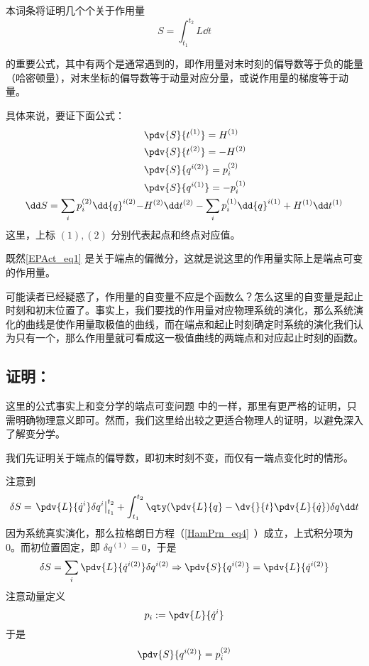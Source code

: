 
本词条将证明几个个关于作用量
\begin{equation}
S=\int_{t_1}^{t_2}L\dd t
\end{equation}

的重要公式，其中有两个是通常遇到的，即作用量对末时刻的偏导数等于负的能量（哈密顿量），对末坐标的偏导数等于动量对应分量，或说作用量的梯度等于动量。

具体来说，要证下面公式：
\begin{equation}\label{EPAct_eq1}
\begin{aligned}
&\pdv{S}{t^{(1)}}=H^{(1)}\\
&\pdv{S}{t^{(2)}}=-H^{(2)}\\
&\pdv{S}{{q}^{i(2)}}=p_i^{(2)}\\
&\pdv{S}{{q}^{i (1)}}=-p_i^{(1)}\\
\dd S=\sum_i p_i^{(2)}\dd {q}^{i (2)}-&H^{(2)}\dd t^{(2)}-\sum_i p_i^{(1)}\dd {q}^{i (1)}+H^{(1)}\dd t^{(1)}
\end{aligned}
\end{equation}
这里，上标 $(1),(2)$ 分别代表起点和终点对应值。

既然\autoref{EPAct_eq1} 是关于端点的偏微分，这就是说这里的作用量实际上是端点可变的作用量。

可能读者已经疑惑了，作用量的自变量不应是个函数么？怎么这里的自变量是起止时刻和初末位置了。事实上，我们要找的作用量对应物理系统的演化，那么系统演化的曲线是使作用量取极值的曲线，而在端点和起止时刻确定时系统的演化我们认为只有一个，那么作用量就可看成这一极值曲线的两端点和对应起止时刻的函数。
\subsection{证明：}
这里的公式事实上和变分学的端点可变问题 中的一样，那里有更严格的证明，只需明确物理意义即可。然而，我们这里给出较之更适合物理人的证明，以避免深入了解变分学。

我们先证明关于端点的偏导数，即初末时刻不变，而仅有一端点变化时的情形。

注意到
\begin{equation}
\delta S=\left.\pdv{L}{\dot q^i}\delta q^i\right|_{t_1}^{t_2}+\int_{t_1}^{t_2}\qty(\pdv{L}{q}-\dv{}{t}\pdv{L}{\dot q})\delta q\dd t
\end{equation}
因为系统真实演化，那么拉格朗日方程（\autoref{HamPrn_eq4}~）成立，上式积分项为0。而初位置固定，即 $\delta q^{(1)}=0$，于是
\begin{equation}
\delta S=\sum_i\pdv{L}{{\dot q}^{i (2)}}\delta {q}^{i (2)}\Rightarrow \pdv{S}{{q}^{i (2)}}=\pdv{L}{{\dot q}^{i (2)}}
\end{equation}
注意动量定义
\begin{equation}
p_i:=\pdv{L}{\dot q^i}
\end{equation}
于是
\begin{equation}
\pdv{S}{{q}^{i (2)}}=p_i^{(2)}
\end{equation}

